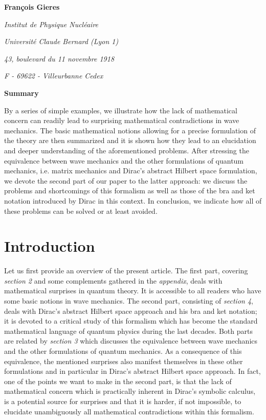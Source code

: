 \documentclass[a4wide,12pt]{report}
\begin{document}
\centerline{{\bf Fran\c cois Gieres}}
\bigskip
\centerline{\it Institut de Physique Nucl\'eaire}
\centerline{\it Universit\'e Claude Bernard (Lyon 1)}
\centerline{\it 43, boulevard du 11 novembre 1918}
\centerline{\it F - 69622 - Villeurbanne Cedex}
\bigskip
\bigskip

\bigskip
\begin{center}
{\bf \Large{Summary}}
\end{center}
By a series of simple examples, we illustrate 
how the lack of mathematical concern can readily lead to 
surprising mathematical contradictions in wave mechanics.
The basic mathematical notions allowing for a precise 
formulation of the theory are then summarized and it 
is shown how they lead to 
an elucidation and deeper understanding 
of the aforementioned problems. 
After stressing the equivalence between  wave mechanics 
and the other formulations of quantum mechanics, 
i.e. matrix mechanics and Dirac's abstract Hilbert space 
formulation,  we devote the second part of our paper 
to the latter approach: 
we discuss the problems and shortcomings of this 
formalism as well as those of the bra and ket notation 
introduced by Dirac in this context. In conclusion, 
we indicate how all of these problems can be solved 
or at least avoided.


 
\newpage
 
\tableofcontents
 
\newpage
 
\setcounter{page}{1}
 
 
\chapter{Introduction}

Let us first provide an overview of the present article. 
The first part,  covering {\em section 2}
and some complements gathered in the  
{\em appendix}, 
deals with mathematical surprises in quantum theory. It 
is accessible to all 
readers who have some basic notions in wave mechanics. 
The second part, consisting of {\em section 4},   
 deals with Dirac's abstract Hilbert space approach and 
his bra and ket notation; it 
is devoted to a critical study 
of this formalism which has become the  
standard mathematical language 
of quantum physics during the last decades. 
Both parts are related by  {\em section 3} 
which discusses the equivalence between wave mechanics
and the other formulations of quantum mechanics.  
 As a consequence of this equivalence, 
the mentioned surprises  also manifest themselves in 
these other formulations and in particular 
in Dirac's abstract Hilbert space approach. 
In fact, one of the points
we want to make in the second part, 
is that the lack of mathematical concern 
which is practically inherent in Dirac's symbolic calculus,
is a potential source for surprises and that it is harder, 
if not impossible, to
elucidate unambiguously all mathematical contradictions within this
formalism. 
\end{document}

